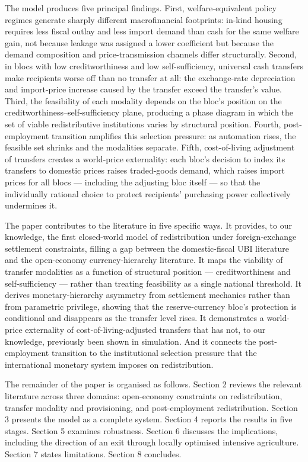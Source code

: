 \documentclass[preprint,review,12pt]{elsarticle}
\begin{document}
The model produces five principal findings. First, welfare-equivalent
policy regimes generate sharply different macrofinancial footprints:
in-kind housing requires less fiscal outlay and less import demand than
cash for the same welfare gain, not because leakage was assigned a lower
coefficient but because the demand composition and price-transmission
channels differ structurally. Second, in blocs with low creditworthiness
and low self-sufficiency, universal cash transfers make recipients worse
off than no transfer at all: the exchange-rate depreciation and
import-price increase caused by the transfer exceed the transfer's
value. Third, the feasibility of each modality depends on the bloc's
position on the creditworthiness--self-sufficiency plane, producing a
phase diagram in which the set of viable redistributive institutions
varies by structural position. Fourth, post-employment transition
amplifies this selection pressure: as automation rises, the feasible set
shrinks and the modalities separate. Fifth, cost-of-living adjustment of
transfers creates a world-price externality: each bloc's decision to
index its transfers to domestic prices raises traded-goods demand, which
raises import prices for all blocs --- including the adjusting bloc
itself --- so that the individually rational choice to protect
recipients' purchasing power collectively undermines it.

The paper contributes to the literature in five specific ways. It
provides, to our knowledge, the first closed-world model of
redistribution under foreign-exchange settlement constraints, filling a
gap between the domestic-fiscal UBI literature and the open-economy
currency-hierarchy literature. It maps the viability of transfer
modalities as a function of structural position --- creditworthiness and
self-sufficiency --- rather than treating feasibility as a single
national threshold. It derives monetary-hierarchy asymmetry from
settlement mechanics rather than from parametric privilege, showing that
the reserve-currency bloc's protection is conditional and disappears as
the transfer level rises. It demonstrates a world-price externality of
cost-of-living-adjusted transfers that has not, to our knowledge,
previously been shown in simulation. And it connects the post-employment
transition to the institutional selection pressure that the
international monetary system imposes on redistribution.

The remainder of the paper is organised as follows. Section 2 reviews
the relevant literature across three domains: open-economy constraints
on redistribution, transfer modality and provisioning, and
post-employment redistribution. Section 3 presents the model as a
complete system. Section 4 reports the results in five stages. Section 5
examines robustness. Section 6 discusses the implications, including the
direction of an exit through locally optimised intensive agriculture.
Section 7 states limitations. Section 8 concludes.
\end{document}
